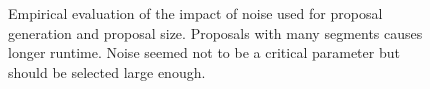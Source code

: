 \documentclass[10pt,twocolumn,letterpaper]{article}
\begin{document}
\begin{figure}[th]
\centering
{}
\caption{Empirical evaluation of the impact of noise used for proposal generation and proposal size.
  Proposals with many segments causes longer runtime. Noise seemed not to be a critical parameter but should be selected large enough.
}
\label{fig:parameterchoice}
\end{figure}
\end{document}
